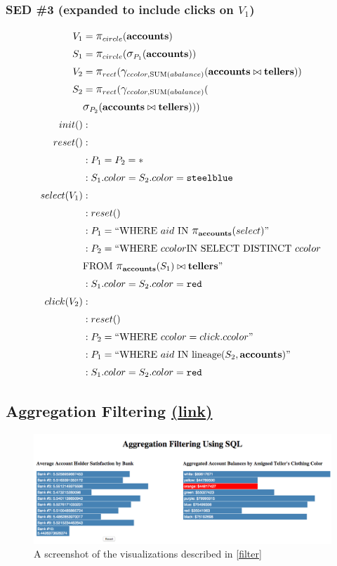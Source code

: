 \subsubsection{SED \#3 (expanded to include clicks on $V_1$)}\label{connect_3}
\begin{align*}
	V_1&= \mathlarger{\pi}_{circle}(\bf{accounts})\\
	S_1&= \mathlarger{\pi}_{circle}(\mathlarger{\sigma}_{P_1}(\bf{accounts}))\\
	V_2&= \mathlarger{\pi}_{rect}(\mathlarger{\gamma}_{ccolor, \text{SUM}(abalance)}(\bf{accounts}\bowtie{}\bf{tellers}))\\
	S_2&= \mathlarger{\pi}_{rect}(\mathlarger{\gamma}_{ccolor, \text{SUM}(abalance)}(\\&\mathlarger{\sigma}_{P_2}(\bf{accounts}\bowtie{}\bf{tellers})))\\
	init()&:\\
	reset()&:\\
	&: P_1 = P_2 = *\\
	&: S_1.color = S_2.color = \texttt{steelblue}\\
	select(V_1)&:\\
	&: reset()\\
	&: P_1 = ``\text{WHERE}~aid~\text{IN}~\mathlarger{\pi}_{\bf{accounts}}(select)"\\
	&: P_2 = ``\text{WHERE}~ccolor\text{IN~SELECT~DISTINCT}~ccolor~\\&\text{FROM}~\mathlarger{\pi}_{\bf{accounts}}(S_1)\bowtie{}\bf{tellers}"\\
	&: S_1.color = S_2.color = \texttt{red}\\
	click(V_2)&:\\
	&: reset()\\
	&: P_2 = ``\text{WHERE}~ccolor=click.ccolor"\\
	&: P_1 = ``\text{WHERE}~aid~\text{IN~lineage}(S_2, \bf{accounts})"\\
	&: S_1.color = S_2.color = \texttt{red}\\
\end{align*}
\subsection{Aggregation Filtering \href{http://randy.cs.columbia.edu/lineage/pgbench-filter/pgbench.html}{(\underline{link})}}\label{filter}
\begin{figure}[H]
	\includegraphics[width=\columnwidth]{figures/filter}
	\caption{A screenshot of the visualizations described in \autoref{filter}
	}
	\label{fig_filter}
\end{figure}
